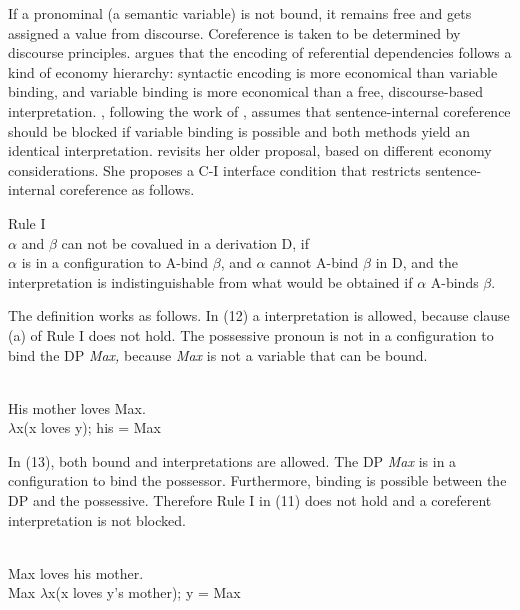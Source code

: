 \documentclass[output=paper]{langsci/langscibook}
\begin{document}
If a pronominal (a semantic variable) is not bound, it remains free and gets assigned a value from discourse. Coreference is taken to be determined by discourse principles. \citet{Reuland2011} argues that the encoding of referential dependencies follows a kind of economy hierarchy: syntactic encoding is more economical than variable binding, and variable binding is more economical than a free, discourse-based interpretation. \citet{Reuland2011}, following the work of \citet{Reinhart1983}, assumes that sentence-internal coreference should be blocked if variable binding is possible and both methods yield an identical interpretation. \citet{Reinhart2006} revisits her older proposal, based on different economy considerations. She proposes a C-I interface condition that restricts sentence-internal coreference as follows.

\ea%
    Rule I \citep[185]{Reinhart2006}\\
$\alpha $ and $\beta $ can not be covalued in a derivation D, if\\\label{ex:wein:11}
    \ea $\alpha $ is in a configuration to A-bind $\beta $, and
    \ex $\alpha $ cannot A-bind $\beta $ in D, and
    \ex the  interpretation is indistinguishable from what would be obtained if $\alpha $ A-binds $\beta $.
    \z
\z

The definition works as follows. In (12) a  interpretation is allowed, because clause (a) of Rule I does not hold. The possessive pronoun is not in a configuration to bind the DP \textit{Max,} because \textit{Max} is not a variable that can be bound.

\ea%
    \citep[186]{Reinhart2006}\\\label{ex:wein:12}
    His mother loves Max.\\ $\lambda $x(x loves y); his = Max\\
\z

In (13), both bound and  interpretations are allowed. The DP \textit{Max} is in a configuration to bind the possessor. Furthermore, binding is possible between the DP and the possessive. Therefore Rule I in (11) does not hold and a coreferent interpretation is not blocked.

\ea%
    \citep[186]{Reinhart2006}\\\label{ex:wein:13}
    Max loves his mother.\\
    Max $\lambda $x(x loves y’s mother); y = Max\\
\z
\end{document}
